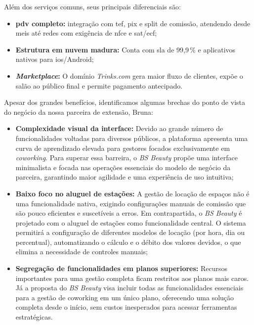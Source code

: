 Além dos serviços comuns, seus principais diferenciais são:

\begin{itemize}
	\item \textbf{\gls{pdv} completo:} integração com \gls{tef}, \gls{pix} e split de comissão, atendendo desde \gls{mei}s até redes com exigência de \gls{nfce} e \gls{sat}/\gls{ecf};
	
	\item \textbf{Estrutura em nuvem madura:} Conta com \gls{sla} de 99,9\,\% e aplicativos nativos para \gls{ios}/Android;
	
	\item \textbf{\emph{Marketplace}:} O domínio \textit{Trinks.com} gera maior fluxo de clientes, expõe o salão ao	público final e permite pagamento antecipado.
\end{itemize}

Apesar dos grandes benefícios, identificamos algumas brechas do ponto de vista do negócio da nossa parceira de extensão, Bruna:

\begin{itemize}
	\item \textbf{Complexidade visual da interface:} Devido ao grande número de funcionalidades voltadas para diversos públicos, a plataforma apresenta uma curva de aprendizado elevada para gestores focados exclusivamente em \emph{coworking}. Para superar essa barreira, o \emph{BS Beauty} propõe uma interface minimalista e focada nas operações essenciais do modelo de negócio da parceira, garantindo maior agilidade e uma experiência de uso intuitiva;
	
	\item \textbf{Baixo foco no aluguel de estações:} A gestão de locação de espaços não é uma funcionalidade nativa, exigindo configurações manuais de comissão que são pouco eficientes e suscetíveis a erros. Em contrapartida, o \emph{BS Beauty} é projetado com o aluguel de estações como funcionalidade central. O sistema permitirá a configuração de diferentes modelos de locação (por hora, dia ou percentual), automatizando o cálculo e o débito dos valores devidos, o que elimina a necessidade de controles manuais;
	
	\item \textbf{Segregação de funcionalidades em planos superiores:} Recursos importantes para uma gestão completa ficam restritos aos planos mais caros. Já a proposta do \emph{BS Beauty} visa incluir todas as funcionalidades essenciais para a gestão de coworking em um único plano, oferecendo uma solução completa desde o início, sem custos inesperados para acessar ferramentas estratégicas.
	
\end{itemize}

